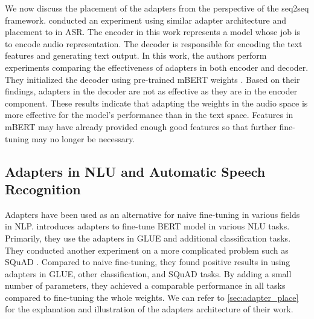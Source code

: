 We now discuss the placement of the adapters from the perspective of the seq2seq framework.  conducted an experiment using similar adapter architecture and placement to  in ASR. The encoder in this work represents a model whose job is to encode audio representation. The decoder is responsible for encoding the text features and generating text output. In this work, the authors perform experiments comparing the effectiveness of adapters in both encoder and decoder. They initialized the decoder using pre-trained mBERT weights . Based on their findings, adapters in the decoder are not as effective as they are in the encoder component. These results indicate that adapting the weights in the audio space is more effective for the model's performance than in the text space. Features in mBERT may have already provided enough good features so that further fine-tuning may no longer be necessary.

\subsection{Adapters in NLU and Automatic Speech Recognition}
\label{sec:app_nlu_asr}
Adapters have been used as an alternative for naive fine-tuning in various fields in NLP.  introduces adapters to fine-tune BERT model in various NLU tasks. Primarily, they use the adapters in GLUE  and additional classification tasks. They conducted another experiment on a more complicated problem such as SQuAD . Compared to naive fine-tuning, they found positive results in using adapters in GLUE, other classification, and SQuAD tasks. By adding a small number of parameters, they achieved a comparable performance in all tasks compared to fine-tuning the whole weights. We can refer to \cref{sec:adapter_place} for the explanation and illustration of the adapters architecture of their work.

